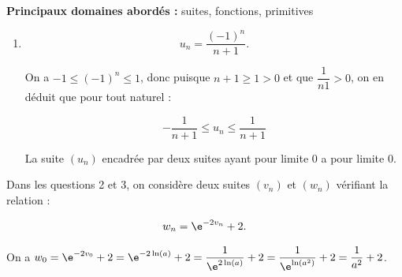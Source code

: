 \textbf{Principaux domaines abordés :} suites, fonctions, primitives

\medskip









\begin{enumerate}
\item 

\[u_n = \dfrac{(- 1)^n}{n + 1}.\]








On a $- 1 \leqslant (- 1)^n \leqslant 1$, donc puisque $n+1 \geqslant 1 > 0$ et que $\dfrac{1}{n  1} > 0$, on en déduit que pour tout naturel :

\[- \dfrac{1}{n+1} \leqslant u_n \leqslant \dfrac{1}{n+1}\]

La suite $\left(u_n\right)$ encadrée par deux suites ayant pour limite 0 a pour limite 0.
\begin{center} \decosix \decosix \decosix  \end{center}
\end{enumerate}

Dans les questions 2 et 3, on considère deux suites $\left(v_n\right)$  et $\left(w_n\right)$ vérifiant la relation : 

\[w_n = \e^{- 2v_n} + 2.\]










On a $w_0 = \e^{- 2v_0} + 2 = \e^{- 2\ln (a)} + 2 = \dfrac{1}{\e^{2\ln(a)}} + 2=  \dfrac{1}{\e^{\ln \left(a^2\right)}} + 2 = \dfrac{1}{a^2} + 2$.

